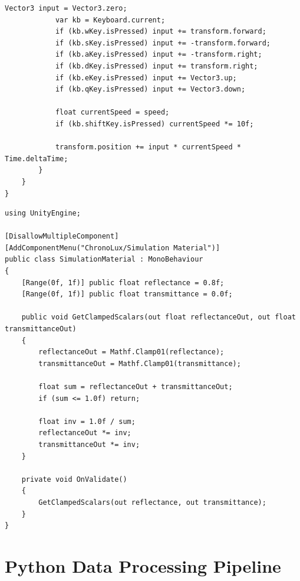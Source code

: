 \begin{lstlisting}[language={[Sharp]C}, caption={FreeLookCamera.cs: Handles the free-look navigation within the simulated laboratory environment.}, label={lst:freelookcamera}]
            Vector3 input = Vector3.zero;
            var kb = Keyboard.current;
            if (kb.wKey.isPressed) input += transform.forward;
            if (kb.sKey.isPressed) input += -transform.forward;
            if (kb.aKey.isPressed) input += -transform.right;
            if (kb.dKey.isPressed) input += transform.right;
            if (kb.eKey.isPressed) input += Vector3.up;
            if (kb.qKey.isPressed) input += Vector3.down;

            float currentSpeed = speed;
            if (kb.shiftKey.isPressed) currentSpeed *= 10f;

            transform.position += input * currentSpeed * Time.deltaTime;
        }
    }
}
\end{lstlisting}

\begin{lstlisting}[language={[Sharp]C}, caption={SimulationMaterial.cs: Maintains energy-conserving reflectance and transmittance limits.}, label={lst:simulationmaterial}]
using UnityEngine;

[DisallowMultipleComponent]
[AddComponentMenu("ChronoLux/Simulation Material")]
public class SimulationMaterial : MonoBehaviour
{
    [Range(0f, 1f)] public float reflectance = 0.8f;
    [Range(0f, 1f)] public float transmittance = 0.0f;

    public void GetClampedScalars(out float reflectanceOut, out float transmittanceOut)
    {
        reflectanceOut = Mathf.Clamp01(reflectance);
        transmittanceOut = Mathf.Clamp01(transmittance);

        float sum = reflectanceOut + transmittanceOut;
        if (sum <= 1.0f) return;

        float inv = 1.0f / sum;
        reflectanceOut *= inv;
        transmittanceOut *= inv;
    }

    private void OnValidate()
    {
        GetClampedScalars(out reflectance, out transmittance);
    }
}
\end{lstlisting}

\section{Python Data Processing Pipeline}
\label{apx:python_code}


